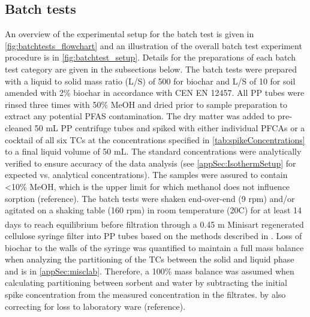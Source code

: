 \subsection{Batch tests}
An overview of the experimental setup for the batch test is given in \cref{fig:batchtests_flowchart} and an illustration of the overall batch test experiment procedure is in \cref{fig:batchtest_setup}. Details for the preparations of each batch test category are given in the subsections below. The batch tests were prepared with a liquid to solid mass ratio (L/S) of 500 for biochar and L/S of 10 for soil amended with 2\% biochar in accordance with CEN EN 12457. All PP tubes were rinsed three times with 50\% MeOH and dried prior to sample preparation to extract any potential PFAS contamination. The dry matter was added to pre-cleaned 50 mL PP centrifuge tubes and spiked with either individual PFCAs or a cocktail of all six TCs at the concentrations specified in \cref{tab:spikeConcentrations} to a final liquid volume of 50 mL. The standard concentrations were analytically verified to ensure accuracy of the data analysis (see \cref{appSec:IsothermSetup} for expected vs. analytical concentrations). The samples were assured to contain \textless 10\% MeOH, which is the upper limit for which methanol does not influence sorption (reference). The batch tests were shaken end-over-end (9 rpm) and/or agitated on a shaking table (160 rpm) in room temperature (20\textdegree C) for at least 14 days to reach equilibrium \citep{higgins2006sorption} before filtration through a 0.45 \textmu m Minisart\textsuperscript{\textregistered} regenerated cellulose syringe filter into PP tubes based on the methods described in \cite{Sorengard2019}. Loss of biochar to the walls of the syringe was quantified to maintain a full mass balance when analyzing the partitioning of the TCs between the solid and liquid phase and is in \cref{appSec:misclab}. Therefore, a 100\% mass balance was assumed when calculating partitioning between sorbent and water by subtracting the initial spike concentration from the measured concentration in the filtrates. by also correcting for loss to laboratory ware (reference). 

